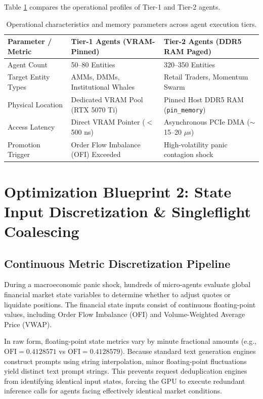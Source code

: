 Table \ref{tab:agent_execution_tiers} compares the operational profiles of Tier-1 and Tier-2 agents.

\begin{table}[htbp]
\centering
\small
\begin{tabularx}{\textwidth}{l X X}
\toprule
\textbf{Parameter / Metric} & \textbf{Tier-1 Agents (VRAM-Pinned)} & \textbf{Tier-2 Agents (DDR5 RAM Paged)} \\
\midrule
Agent Count & 50--80 Entities & 320--350 Entities \\
Target Entity Types & AMMs, DMMs, Institutional Whales & Retail Traders, Momentum Swarm \\
Physical Location & Dedicated VRAM Pool (RTX 5070 Ti) & Pinned Host DDR5 RAM (\texttt{pin\_memory}) \\
Access Latency & Direct VRAM Pointer ($<$ 500 ns) & Asynchronous PCIe DMA ($\sim$15--20 $\mu$s) \\
Promotion Trigger & Order Flow Imbalance (OFI) Exceeded & High-volatility panic contagion shock \\
\bottomrule
\end{tabularx}
\caption{Operational characteristics and memory parameters across agent execution tiers.}
\label{tab:agent_execution_tiers}
\end{table}

\section{Optimization Blueprint 2: State Input Discretization \& Singleflight Coalescing}

\subsection{Continuous Metric Discretization Pipeline}

During a macroeconomic panic shock, hundreds of micro-agents evaluate global financial market state variables to determine whether to adjust quotes or liquidate positions. The financial state inputs consist of continuous floating-point values, including Order Flow Imbalance (OFI) and Volume-Weighted Average Price (VWAP).

In raw form, floating-point state metrics vary by minute fractional amounts (e.g., $\text{OFI} = 0.4128571$ vs $\text{OFI} = 0.4128579$). Because standard text generation engines construct prompts using string interpolation, minor floating-point fluctuations yield distinct text prompt strings. This prevents request deduplication engines from identifying identical input states, forcing the GPU to execute redundant inference calls for agents facing effectively identical market conditions.

